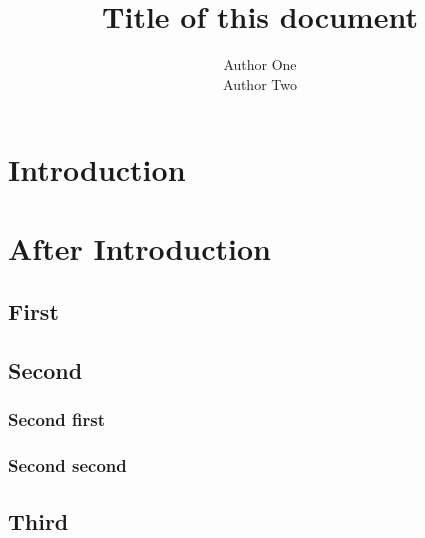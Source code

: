 \documentclass[11pt]{report}
\begin{document}
\title{Title of this document}
\author{Author One \\ Author Two}

\maketitle

\tableofcontents


\chapter{Introduction}
\chapter{After Introduction}
\section{First}
\section{Second}
\subsection{Second first}
\subsection{Second second}
\section{Third}
\end{document}
